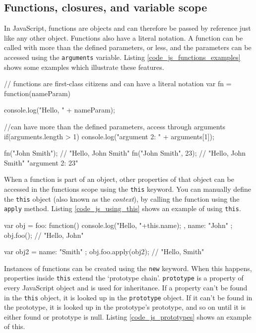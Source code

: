 
\subsection{Functions, closures, and variable scope} %
\label{sub:functions_closures_and_variable_scope}
In JavaScript, functions are objects and can therefore be passed by reference just like any other object. Functions also have a literal notation. A function can be called with more than the defined parameters, or less, and the parameters can be accessed using the \lstinline{arguments} variable. Listing \ref{code_js_functions_examples} shows some examples which illustrate these features.

\begin{code}
// functions are first-class citizens and can have a literal notation
var fn = function(nameParam){
  console.log("Hello, " + nameParam);

  //can have more than the defined parameters, access through arguments
  if(arguments.length > 1){
  	console.log("argument 2: " + arguments[1]);
  }
}
fn("John Smith"); // "Hello, John Smith"
fn("John Smith", 23); // "Hello, John Smith" "argument 2: 23"
\end{code}

When a function is part of an object, other properties of that object can be accessed in the functions scope using the \lstinline{this} keyword. You can manually define the \lstinline{this} object (also known as the \emph{context}), by calling the function using the \lstinline{apply} method. Listing \ref{code_js_using_this} shows an example of using \lstinline{this}.

\begin{code}
var obj = {
  foo: function(){ console.log("Hello, "+this.name); },
  name: "John"
};
obj.foo(); // "Hello, John"

var obj2 = {
  name: "Smith"
};
obj.foo.apply(obj2); // "Hello, Smith"

\end{code}

Instances of functions can be created using the \lstinline{new} keyword. When this happens, properties inside \lstinline{this} extend the `prototype chain'. \lstinline{prototype} is a property of every JavaScript object and is used for inheritance. If a property can't be found in the \lstinline{this} object, it is looked up in the \lstinline{prototype} object. If it can't be found in the prototype, it is looked up in the prototype's prototype, and so on until it is either found or prototype is null. Listing \ref{code_js_prototypes} shows an example of this.

